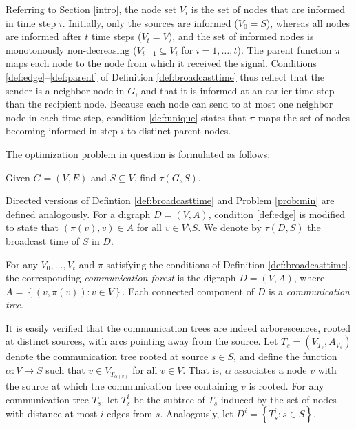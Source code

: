 Referring to Section \ref{intro}, the node set $V_i$ is the set of nodes that are informed in time step $i$.
Initially, only the sources are informed ($V_0=S$), whereas all nodes are informed after $t$ time steps ($V_t=V$),
and the set of informed nodes is monotonously non-decreasing ($V_{i-1}\subseteq V_i$ for $i=1,\ldots,t$).
The parent function $\pi$ maps each node to the node from which it received the signal.
Conditions \ref{def:edge}--\ref{def:parent} of Definition \ref{def:broadcasttime} thus reflect that the sender is a neighbor node in $G$,
and that it is informed at an earlier time step than the recipient node.
Because each node can send to at most one neighbor node in each time step,
condition \ref{def:unique} states that $\pi$ maps the set of nodes becoming informed in step $i$ to distinct parent nodes.

The optimization problem in question is formulated as follows:
\begin{problem}\label{prob:min}
Given $G=(V,E)$ and $S\subseteq V$, find $\tau(G,S)$.
\end{problem}

Directed versions of Defintion \ref{def:broadcasttime} and Problem \ref{prob:min} are defined analogously.
For a digraph $D=(V,A)$, condition \ref{def:edge} is modified to state that $(\pi(v),v)\in A$ for all $v\in V\setminus S$.
We denote by $\tau(D,S)$ the broadcast time of $S$ in $D$.

\begin{definition} \label{def:broadcastgraph}
For any $V_0,\ldots,V_t$ and $\pi$ satisfying the conditions of Definition \ref{def:broadcasttime},
the corresponding \emph{communication forest} is
the digraph $D=(V,A)$, where $A=\left\{\left(v,\pi(v)\right): v\in V\right\}$.
Each connected component of $D$ is a \emph{communication tree}.
\end{definition}

\noindent
It is easily verified that the communication trees are indeed arborescences, rooted at distinct sources, with arcs pointing away from the source.
Let $T_s=\left(V_{T_s},A_{V_s}\right)$ denote the communication tree rooted at source $s\in S$, and define
the function $\alpha:V\to S$ such that $v\in V_{T_{\alpha(v)}}$ for all $v\in V$.
That is, $\alpha$ associates a node $v$ with the source at which the communication tree containing $v$ is rooted.
For any communication tree $T_s$, let $T^i_s$ be the subtree of $T_s$ induced by the set of nodes with distance at most $i$ edges from $s$.
Analogously, let $D^i=\left\{T_s^i: s\in S\right\}$.

